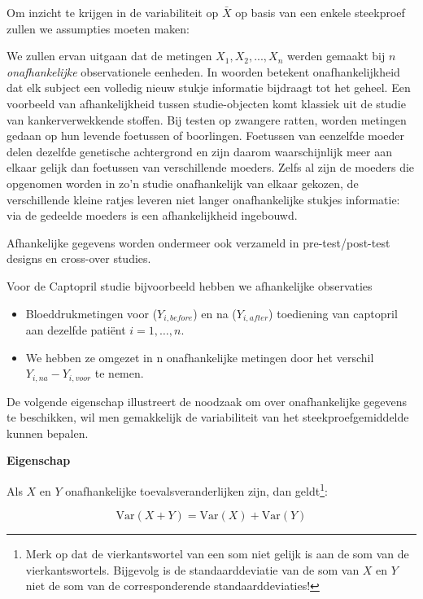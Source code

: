 \documentclass[
  12pt,dutch]{book}
\providecommand{\tightlist}{%
  \setlength{\itemsep}{0pt}\setlength{\parskip}{0pt}}
\theoremstyle{definition}
\theoremstyle{definition}
\theoremstyle{definition}
\theoremstyle{definition}
\theoremstyle{remark}
\begin{document}
Om inzicht te krijgen in de variabiliteit op \(\bar X\) op basis van een enkele steekproef zullen we assumpties moeten maken:

We zullen ervan uitgaan dat de metingen \(X_1, X_2, ..., X_n\) werden gemaakt bij \(n\) \emph{onafhankelijke}
observationele eenheden. In woorden betekent onafhankelijkheid dat elk subject een volledig
nieuw stukje informatie bijdraagt tot het geheel. Een voorbeeld van
afhankelijkheid tussen studie-objecten komt klassiek uit de studie van
kankerverwekkende stoffen. Bij testen op zwangere ratten, worden metingen
gedaan op hun levende foetussen of boorlingen. Foetussen van eenzelfde
moeder delen dezelfde genetische achtergrond en zijn daarom waarschijnlijk
meer aan elkaar gelijk dan foetussen van verschillende moeders. Zelfs al
zijn de moeders die opgenomen worden in zo'n studie onafhankelijk van elkaar
gekozen, de verschillende kleine ratjes leveren niet langer onafhankelijke
stukjes informatie: via de gedeelde moeders is een afhankelijkheid
ingebouwd.

Afhankelijke gegevens worden ondermeer ook verzameld in
pre-test/post-test designs en cross-over studies.

Voor de Captopril studie bijvoorbeeld hebben we afhankelijke observaties

\begin{itemize}
\tightlist
\item
  Bloeddrukmetingen voor (\(Y_{i,before}\)) en na (\(Y_{i,after}\)) toediening van captopril aan dezelfde patiënt \(i=1,\ldots,n\).
\item
  We hebben ze omgezet in n onafhankelijke metingen door het verschil \(Y_{i,na}-Y_{i,voor}\) te nemen.
\end{itemize}

De volgende eigenschap illustreert de noodzaak om over onafhankelijke gegevens te beschikken,
wil men gemakkelijk de variabiliteit van het steekproefgemiddelde kunnen bepalen.

\textbf{Eigenschap}

Als \(X\) en \(Y\) onafhankelijke toevalsveranderlijken zijn,
dan geldt\footnote{Merk op dat de vierkantswortel van een som niet gelijk is aan de som van de
  vierkantswortels. Bijgevolg is de standaarddeviatie van de som van \(X\) en \(Y\)
  niet de som van de corresponderende standaarddeviaties!}:

\begin{equation*}
\text{Var}(X+Y) = \text{Var}(X) + \text{Var}(Y)
\end{equation*}
\end{document}
